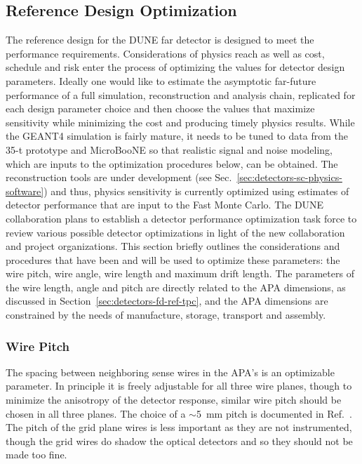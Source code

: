 \subsection{Reference Design Optimization}
\label{sec:detectors-fd-ref-optimization}

The reference design for the DUNE far detector is designed to meet the
performance requirements. Considerations of physics reach as well as
cost, schedule and risk enter the process of optimizing the values for
detector design parameters. Ideally one would like to estimate the
asymptotic far-future performance of a full simulation, reconstruction
and analysis chain, replicated for each design parameter choice and
then choose the values that maximize sensitivity while minimizing the
cost and producing timely physics results. While the GEANT4 simulation
is fairly mature, it needs to be tuned to data from the 35-t prototype
and MicroBooNE so that realistic signal and noise modeling, which are
inputs to the optimization procedures below, can be obtained. The
reconstruction tools are under development (see
Sec.~\ref{sec:detectors-sc-physics-software}) and thus, physics
sensitivity is currently optimized using estimates of detector
performance that are input to the Fast Monte Carlo. The DUNE
collaboration plans to establish a detector performance optimization
task force to review various possible detector optimizations in light
of the new collaboration and project organizations.  This section
briefly outlines the considerations and procedures that have been and
will be used to optimize these parameters: the wire pitch, wire
angle, wire length and  maximum drift length.  The parameters
of the wire length, angle and pitch are directly related to the
APA dimensions, as discussed in
Section~\ref{sec:detectors-fd-ref-tpc}, and the APA dimensions are
constrained by the needs of manufacture, storage, transport and
assembly.


\subsubsection{Wire Pitch}

The spacing between neighboring sense wires in the APA's is an
optimizable parameter.  In principle it is freely adjustable for all
three wire planes, though to minimize the anisotropy of the detector
response, similar wire pitch should be chosen in all three planes.
The choice of a $\sim$5~mm pitch is documented in
Ref.~\cite{docdb-3407}.  The pitch of the grid plane wires is less
important as they are not instrumented, though the grid wires do
shadow the optical detectors and so they should not be made too fine.

